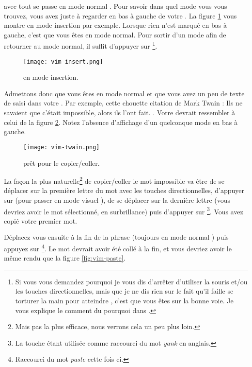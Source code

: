  avec \vim tout se passe en mode \og normal \fg. Pour savoir dans quel mode vous vous trouvez, vous avez juste à regarder en bas à gauche de votre \vim. La figure \ref{fig:insert} vous montre \vim en mode \og insertion \fg{} par exemple. Lorsque rien n'est marqué en bas à gauche, c'est que vous êtes en mode normal. Pour sortir d'un mode afin de retourner au mode normal, il suffit d'appuyer sur \ttesc\footnote{Si vous vous demandez pourquoi je vous dis d'arrêter d'utiliser la souris et/ou les touches directionnelles, mais que je ne dis rien sur le fait qu'il faille se torturer la main pour atteindre \ttesc, c'est que vous êtes sur la bonne voie. Je vous explique le comment du pourquoi dans \og {} \fg.}.

\begin{figure}%
  \texttt{[image: vim-insert.png]}
  \caption{\vim en mode insertion.}
  \label{fig:insert}
\end{figure}

Admettons donc que vous êtes en mode \og normal \fg{} et que vous avez un peu de texte de saisi dans votre \vim. Par exemple, cette chouette citation de Mark Twain : \og Ils ne savaient que c'était impossible, alors ils l'ont fait. \fg{}. Votre \vim devrait ressembler à celui de la figure \ref{fig:vim-twain}. Notez l'absence d'affichage d'un quelconque mode en bas à gauche.

\begin{figure}%
  \texttt{[image: vim-twain.png]}
  \caption{\vim prêt pour le copier/coller.}
  \label{fig:vim-twain}
\end{figure}

La façon la plus naturelle\footnote{Mais pas la plus efficace, nous verrons cela un peu plus loin.} de copier/coller le mot \og impossible \fg{} va être de se déplacer sur la première lettre du mot avec les touches directionnelles, d'appuyer sur \ttv (pour passer en mode \og visuel \fg), de se déplacer sur la dernière lettre (vous devriez avoir le mot sélectionné, en surbrillance) puis d'appuyer sur \tty\footnote{La touche \ty étant utilisée comme raccourci du mot \emph{yank} en anglais.}. Vous avez copié votre premier mot.

Déplacez vous ensuite à la fin de la phrase (toujours en mode \og normal \fg) puis appuyez sur \ttp\footnote{Raccourci du mot \emph{paste} cette fois ci.}. Le mot devrait avoir été collé à la fin, et vous devriez avoir le même rendu que la figure \ref{fig:vim-paste}.

